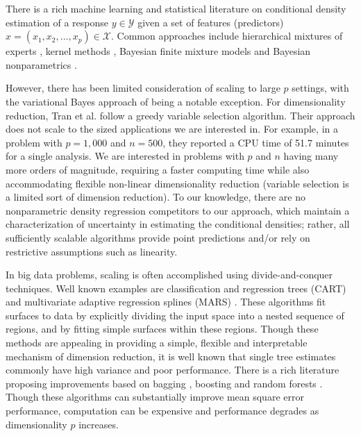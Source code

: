 There is a rich machine learning and statistical literature on conditional density estimation of a response $y \in \mathcal{Y}$ given a set of features (predictors) $x=(x_1, x_2, \ldots, x_p)\in \mathcal{X}$. Common approaches include hierarchical mixtures of experts \cite{mixtureexperts,jiang1999}, kernel methods \cite{fan1996,fanyim2004,holmes2010,fu2011}, Bayesian finite mixture models \cite{nott2012,tran2012,norets2012} and Bayesian nonparametrics 
\cite{griffin06, dunson2007, DunsonPark, chung2009, tokdar2010}.  

However, there has been limited consideration of scaling to large $p$ settings, with the variational Bayes approach of \cite{tran2012} being a notable exception. For dimensionality reduction, Tran et al. follow a greedy variable selection algorithm.  Their approach does not scale to the sized applications we are interested in. For example, in a problem with $p=1,000$ and $n=500$, they reported a CPU time of 51.7 minutes for a single analysis.  We are interested in problems with  $p$ and $n$ having many more orders of magnitude, requiring a faster computing time while also accommodating flexible non-linear dimensionality reduction (variable selection is a limited sort of dimension reduction).  To our knowledge, there are no nonparametric density regression competitors to our approach, which maintain a characterization of uncertainty in estimating the conditional densities; rather, all sufficiently scalable algorithms provide point predictions and/or rely on restrictive assumptions such as linearity.  

In big data problems, scaling is often accomplished using divide-and-conquer techniques. Well known examples are classification and regression trees (CART) \cite{CART} and multivariate adaptive regression splines (MARS) \cite{MARS}. These algorithms fit surfaces to data by explicitly dividing the input space into a nested sequence of regions, and by fitting simple surfaces  within these regions. Though these methods are appealing in providing a simple, flexible and interpretable mechanism of dimension reduction, it is well known that single tree estimates commonly have high variance and poor performance.  There is a rich literature proposing improvements based on bagging \cite{Bagging}, boosting \cite{Boosting} and random forests \cite{RandomForest}. Though these algorithms can substantially improve mean square error performance, computation can be expensive and performance degrades as dimensionality $p$ increases.

